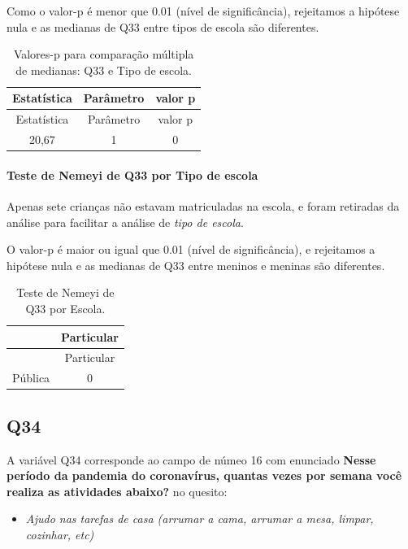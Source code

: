 \documentclass[]{article}
\providecommand{\tightlist}{%
  \setlength{\itemsep}{0pt}\setlength{\parskip}{0pt}}
\let\oldparagraph\paragraph
\renewcommand{\paragraph}[1]{\oldparagraph{#1}\mbox{}}
\begin{document}
Como o valor-p é menor que 0.01 (nível de significância), rejeitamos a hipótese nula e as medianas de Q33 entre tipos de escola são diferentes.

\begin{longtable}[]{@{}ccc@{}}
\caption{\label{tab:unnamed-chunk-1180}Valores-p para comparação múltipla de medianas: Q33 e Tipo de escola.}\tabularnewline
\toprule
Estatística & Parâmetro & valor p\tabularnewline
\midrule
\endfirsthead
\toprule
Estatística & Parâmetro & valor p\tabularnewline
\midrule
\endhead
20,67 & 1 & 0\tabularnewline
\bottomrule
\end{longtable}

\hypertarget{teste-de-nemeyi-de-q33-por-tipo-de-escola}{%
\paragraph{Teste de Nemeyi de Q33 por Tipo de escola}\label{teste-de-nemeyi-de-q33-por-tipo-de-escola}}

Apenas sete crianças não estavam matriculadas na escola, e foram retiradas da análise para facilitar a análise de \emph{tipo de escola}.

O valor-p é maior ou igual que 0.01 (nível de significância), e rejeitamos a hipótese nula e as medianas de Q33 entre meninos e meninas são diferentes.

\begin{longtable}[]{@{}lc@{}}
\caption{\label{tab:unnamed-chunk-1182}Teste de Nemeyi de Q33 por Escola.}\tabularnewline
\toprule
& Particular\tabularnewline
\midrule
\endfirsthead
\toprule
& Particular\tabularnewline
\midrule
\endhead
Pública & 0\tabularnewline
\bottomrule
\end{longtable}

\cleardoublepage

\hypertarget{q34}{%
\subsection{Q34}\label{q34}}

A variável Q34 corresponde ao campo de númeo 16 com enunciado \textbf{Nesse período da pandemia do coronavírus, quantas vezes por semana você realiza as atividades abaixo?} no quesito:

\begin{itemize}
\tightlist
\item
  \emph{Ajudo nas tarefas de casa (arrumar a cama, arrumar a mesa, limpar, cozinhar, etc)}
\end{itemize}
\end{document}
